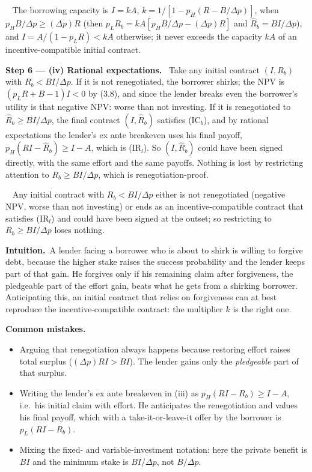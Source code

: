 \documentclass[11pt,a4paper]{article}
\newcommand{\step}[2]{\par\medskip\noindent\textbf{Step #1 --- #2.}~}
\newcommand{\intuition}{\par\medskip\noindent\textbf{Intuition.}~}
\newcommand{\answer}[1]{\par\smallskip\noindent\fbox{\textbf{Answer #1.}}~}
\newcommand{\pitfalls}{\par\medskip\noindent\textbf{Common mistakes.}}
\begin{document}
\answer{(iii)} The borrowing capacity is $I=kA$, $k=1/[1-p_H(R-B/\Delta p)]$, when
$p_HB/\Delta p\ge(\Delta p)R$ (then $p_LR_b=kA[p_HB/\Delta p-(\Delta p)R]$ and $\hat R_b=BI/\Delta p$),
and $I=A/(1-p_LR)<kA$ otherwise; it never exceeds the capacity $kA$ of an incentive-compatible
initial contract.

\step{6}{(iv) Rational expectations} Take any initial contract $(I,R_b)$ with $R_b<BI/\Delta p$. If it is
not renegotiated, the borrower shirks; the NPV is $(p_LR+B-1)I<0$ by (3.8), and since the lender
breaks even the borrower's utility is that negative NPV: worse than not investing. If it is
renegotiated to $\hat R_b\ge BI/\Delta p$, the final contract $(I,\hat R_b)$ satisfies (IC$_b$), and by
rational expectations the lender's ex ante breakeven uses his final payoff,
$p_H(RI-\hat R_b)\ge I-A$, which is (IR$_l$). So $(I,\hat R_b)$ could have been signed directly, with the
same effort and the same payoffs. Nothing is lost by restricting attention to $R_b\ge BI/\Delta p$,
which is renegotiation-proof.

\answer{(iv)} Any initial contract with $R_b<BI/\Delta p$ either is not renegotiated (negative NPV,
worse than not investing) or ends as an incentive-compatible contract that satisfies (IR$_l$) and
could have been signed at the outset; so restricting to $R_b\ge BI/\Delta p$ loses nothing.

\intuition A lender facing a borrower who is about to shirk is willing to forgive debt, because the
higher stake raises the success probability and the lender keeps part of that gain. He forgives only
if his remaining claim after forgiveness, the pledgeable part of the effort gain, beats what he gets
from a shirking borrower. Anticipating this, an initial contract that relies on forgiveness can at
best reproduce the incentive-compatible contract: the multiplier $k$ is the right one.

\pitfalls
\begin{itemize}
  \item Arguing that renegotiation always happens because restoring effort raises total surplus
        ($(\Delta p)RI>BI$). The lender gains only the \emph{pledgeable} part of that surplus.
  \item Writing the lender's ex ante breakeven in (iii) as $p_H(RI-R_b)\ge I-A$, i.e.\ his initial
        claim with effort. He anticipates the renegotiation and values his final payoff, which with a
        take-it-or-leave-it offer by the borrower is $p_L(RI-R_b)$.
  \item Mixing the fixed- and variable-investment notation: here the private benefit is $BI$ and the
        minimum stake is $BI/\Delta p$, not $B/\Delta p$.
\end{itemize}
\end{document}
